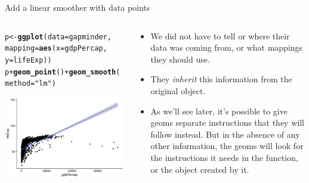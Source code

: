 \documentclass[10pt,handout]{beamer}\usepackage[]{graphicx}\usepackage[]{color}
\makeatletter
\def\maxwidth{ %
  \ifdim\Gin@nat@width>\linewidth
    \linewidth
  \else
    \Gin@nat@width
  \fi
}
\newcommand{\hlstr}[1]{\textcolor[rgb]{0.192,0.494,0.8}{#1}}%
\newcommand{\hlopt}[1]{\textcolor[rgb]{0,0,0}{#1}}%
\newcommand{\hlstd}[1]{\textcolor[rgb]{0.345,0.345,0.345}{#1}}%
\newcommand{\hlkwb}[1]{\textcolor[rgb]{0.69,0.353,0.396}{#1}}%
\newcommand{\hlkwc}[1]{\textcolor[rgb]{0.333,0.667,0.333}{#1}}%
\newcommand{\hlkwd}[1]{\textcolor[rgb]{0.737,0.353,0.396}{\textbf{#1}}}%
\newenvironment{kframe}{%
 \def\at@end@of@kframe{}%
 \ifinner\ifhmode%
  \def\at@end@of@kframe{\end{minipage}}%
  \begin{minipage}{\columnwidth}%
 \fi\fi%
 \def\FrameCommand##1{\hskip\@totalleftmargin \hskip-\fboxsep
 \colorbox{shadecolor}{##1}\hskip-\fboxsep
     \hskip-\linewidth \hskip-\@totalleftmargin \hskip\columnwidth}%
 \MakeFramed {\advance\hsize-\width
   \@totalleftmargin\z@ \linewidth\hsize
   \@setminipage}}%
 {\par\unskip\endMakeFramed%
 \at@end@of@kframe}
\newenvironment{knitrout}{}{} %
\makeatother
\begin{document}
\begin{frame}[fragile]{Add a linear smoother with data points}
	\begin{columns}
		\begin{column}{0.5\textwidth}  %
\begin{knitrout}\tiny
{}\color{fgcolor}\begin{kframe}
\begin{alltt}
\hlstd{p} \hlkwb{<-} \hlkwd{ggplot}\hlstd{(}\hlkwc{data} \hlstd{= gapminder,}
\hlkwc{mapping} \hlstd{=} \hlkwd{aes}\hlstd{(}\hlkwc{x} \hlstd{= gdpPercap,}
\hlkwc{y}\hlstd{=lifeExp))}
\hlstd{p} \hlopt{+} \hlkwd{geom_point}\hlstd{()} \hlopt{+} \hlkwd{geom_smooth}\hlstd{(}\hlkwc{method} \hlstd{=} \hlstr{"lm"}\hlstd{)}
\end{alltt}


{\ttfamily\noindent\itshape{}}\end{kframe}

{\centering \includegraphics[width=\maxwidth]{figure/unnamed-chunk-8-1} 

}


\end{knitrout}
		\end{column}\pause 
		\begin{column}{0.5\textwidth}
			\begin{itemize}
				\item We did not have to tell  or 
				where their data was coming from, or what mappings they should use.
\pause	\item 			They \textit{inherit} this information from the original  object. 
	\item As we'll see later, it’s possible to give geoms separate instructions that they
				will follow instead. But in the absence of any other information, the
				geoms will look for the instructions it needs in the 
				function, or the object created by it.
			\end{itemize}
		\end{column}
	\end{columns}
\end{frame}
\end{document}
